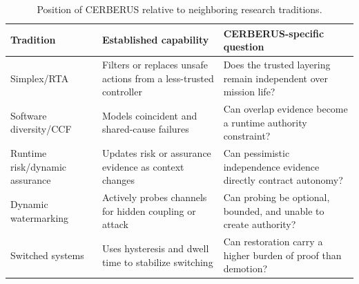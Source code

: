\begin{table}[t]
\centering
\caption{Position of CERBERUS relative to neighboring research traditions.}
\label{tab:position}
\small
\begin{tabularx}{\textwidth}{@{}p{}X X@{}}
\toprule
Tradition & Established capability & CERBERUS-specific question \\
\midrule
Simplex/RTA & Filters or replaces unsafe actions from a less-trusted controller & Does the trusted layering remain independent over mission life? \\
Software diversity/CCF & Models coincident and shared-cause failures & Can overlap evidence become a runtime authority constraint? \\
Runtime risk/dynamic assurance & Updates risk or assurance evidence as context changes & Can pessimistic independence evidence directly contract autonomy? \\
Dynamic watermarking & Actively probes channels for hidden coupling or attack & Can probing be optional, bounded, and unable to create authority? \\
Switched systems & Uses hysteresis and dwell time to stabilize switching & Can restoration carry a higher burden of proof than demotion? \\
\bottomrule
\end{tabularx}
\end{table}
